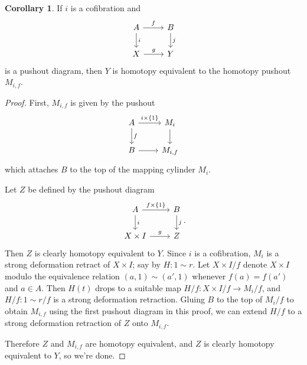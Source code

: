\documentclass[10pt]{article}
\theoremstyle{definition}
\newtheorem{corollary}[lemma]{Corollary}
\begin{document}
\begin{corollary}
If $i$ is a cofibration and
$$\begin{tikzcd}
A \arrow[r,"f"] \arrow[d,"i"] & B \arrow[d,"j"]\\
X \arrow[r,"g"] & Y
\end{tikzcd}$$
is a pushout diagram, then $Y$ is homotopy equivalent to the homotopy pushout $M_{i,f}$.
\end{corollary}
\begin{proof}
First, $M_{i,f}$ is given by the pushout
$$\begin{tikzcd}
A \arrow[r,"i \times \{1\}"] \arrow[d,"f"] & M_i \arrow[d] \\
B \arrow[r] & M_{i,f}
\end{tikzcd}$$
which attaches $B$ to the top of the mapping cylinder $M_i$.

Let $Z$ be defined by the pushout diagram
$$\begin{tikzcd}
A \arrow[r,"f \times \{1\}"] \arrow[d,"i"] & B \arrow[d,"j"]\\
X \times I \arrow[r,"g"] & Z
\end{tikzcd}.$$
Then $Z$ is clearly homotopy equivalent to $Y$.
Since $i$ is a cofibration, $M_i$ is a strong deformation retract of $X \times I$; say by $H: 1 \sim r$.
Let $X \times I/f$ denote $X \times I$ modulo the equivalence relation $(a, 1) \sim (a', 1)$ whenever $f(a) = f(a')$ and $a \in A$.
Then $H(t)$ drops to a suitable map $H/f: X \times I/f \to M_i/f$, and $H/f: 1 \sim r/f$ is a strong deformation retraction.
Gluing $B$ to the top of $M_i/f$ to obtain $M_{i,f}$ using the first pushout diagram in this proof, we can extend $H/f$ to a strong deformation retraction of $Z$ onto $M_{i,f}$.

Therefore $Z$ and $M_{i,f}$ are homotopy equivalent, and $Z$ is clearly homotopy equivalent to $Y$, so we're done.
\end{proof}
\end{document}
